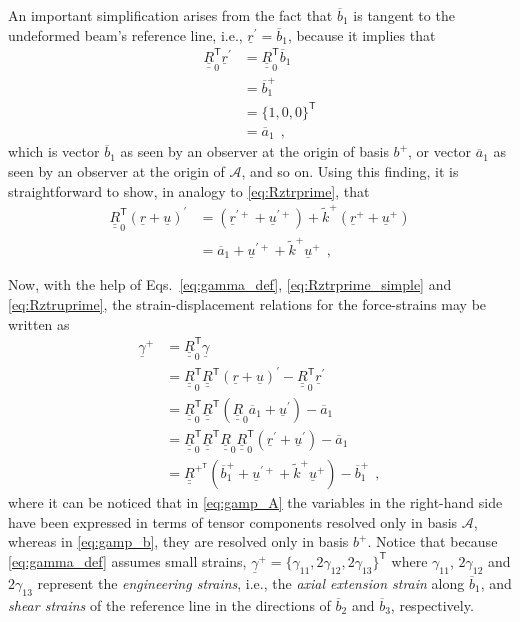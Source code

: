 \documentclass[12pt,a4paper,oneside,english]{abntex2} %
\newcommand{\vect}[1]{\underline{#1}}
\newcommand{\uvec}[1]{\overline{#1}}
\def\tens#1{\underline{\underline{#1}}}
\def\til#1{\widetilde{#1}}
\def\lp{\left(}
\def\rp{\right)}
\def\T{\mathsf{T}}
\def\A{\mathcal{A}}
\def\bp{b^+}
\def\aone{\uvec{a}_1}
\def\R{\tens{R}}
\def\RT{\R^\T}
\def\RpT{\R^{+^\T}}
\def\Rz{\R_0}
\def\RzT{\R^\T_0}
\def\r{\vect{r}}
\def\rplus{\r^{+}}
\def\rprime{\r^{\prime}}
\def\rpprime{\r^{\prime +}}
\def\u{\vect{u}}
\def\uplus{\u^{+}}
\def\uprime{\u^{\prime}}
\def\upprime{\u^{\prime+}}
\def\gam{\vect{\gamma}}
\def\gamp{\gam^{+}}
\def\ktil{\til{k}}
\def\ktilp{\ktil^{+}}
\begin{document}
An important simplification arises from the fact that $\uvec{b}_1$ is tangent to the undeformed beam's reference line, i.e., $\rprime = \uvec{b}_1$, because it implies that 
\begin{align}
    \RzT\rprime &= \RzT\uvec{b}_1 \nonumber 
    \\ 
    &= \uvec{b}^{+}_1 \nonumber 
    \\
    &= \{1, 0, 0\}^\T \nonumber 
    \\
    &= \aone \ \ ,
    \label{eq:Rztrprime_simple}
\end{align}
which is vector $\uvec{b}_1$ as seen by an observer at the origin of basis $\bp$, or vector $\aone$ as seen by an observer at the origin of $\A$, and so on. Using this finding, it is straightforward to show, in analogy to \cref{eq:Rztrprime}, that
\begin{align}
    \RzT\lp\r+\u\rp^\prime &= \lp\rpprime+\upprime\rp + \ktilp\lp\rplus+\uplus\rp \nonumber 
    \\
    &= \aone + \upprime + \ktilp\uplus \ \ ,
    \label{eq:Rztruprime}
\end{align}

Now, with the help of Eqs.~\eqref{eq:gamma_def}, \eqref{eq:Rztrprime_simple} and \eqref{eq:Rztruprime}, the strain-displacement relations for the force-strains may be written as
\begin{align}
    \gamp 
    &= \RzT\gam \nonumber 
    \\
    &= \RzT\RT \lp\r+\u\rp^\prime-\RzT\r^\prime \nonumber 
    \\
    &= \RzT\RT \lp\Rz\aone+\uprime\rp-\aone 
    \label{eq:gamp_A} 
    \\
    &= \RzT\RT\Rz\RzT\lp\rprime+\uprime\rp-\aone \nonumber 
    \\
    &= \RpT\lp\uvec{b}^{+}_1 + \upprime + \ktilp\uplus\rp - \uvec{b}^{+}_1 \ \ ,
    \label{eq:gamp_b}
\end{align}
where it can be noticed that in \cref{eq:gamp_A} the variables in the right-hand side have been expressed in terms of tensor components resolved only in basis $\A$, whereas in \cref{eq:gamp_b}, they are resolved only in basis $\bp$. Notice that because \cref{eq:gamma_def} assumes small strains, $\gamp = \{\gamma_{11},2\gamma_{12},2\gamma_{13}\}^\T$ where $\gamma_{11}$, $2\gamma_{12}$ and $2\gamma_{13}$ represent the \textit{engineering strains}, i.e., the \textit{axial extension strain} along $\uvec{b}_1$, and \textit{shear strains} of the reference line in the directions of $\uvec{b}_2$ and $\uvec{b}_3$, respectively.
\end{document}
